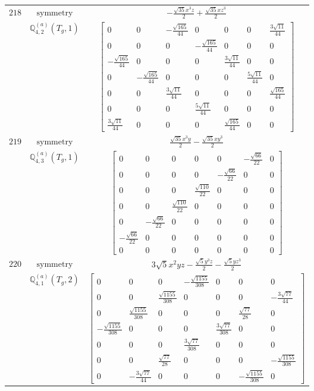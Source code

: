 \documentclass[fleqn,8pt,landscape]{jsarticle}
\begin{document}
\begin{longtable}{ccc}
$ 218 $ & $ \text{symmetry} $ & $ - \frac{\sqrt{35} x^{3} z}{2} + \frac{\sqrt{35} x z^{3}}{2} $ \\
$  $ & $ \mathbb{Q}_{4,2}^{(a)}(T_{g},1) $ & $ \begin{bmatrix} 0 & 0 & - \frac{\sqrt{165}}{44} & 0 & 0 & 0 & \frac{3 \sqrt{11}}{44} \\ 0 & 0 & 0 & - \frac{\sqrt{165}}{44} & 0 & 0 & 0 \\ - \frac{\sqrt{165}}{44} & 0 & 0 & 0 & \frac{3 \sqrt{11}}{44} & 0 & 0 \\ 0 & - \frac{\sqrt{165}}{44} & 0 & 0 & 0 & \frac{5 \sqrt{11}}{44} & 0 \\ 0 & 0 & \frac{3 \sqrt{11}}{44} & 0 & 0 & 0 & \frac{\sqrt{165}}{44} \\ 0 & 0 & 0 & \frac{5 \sqrt{11}}{44} & 0 & 0 & 0 \\ \frac{3 \sqrt{11}}{44} & 0 & 0 & 0 & \frac{\sqrt{165}}{44} & 0 & 0 \end{bmatrix} $ \\ \hline
$ 219 $ & $ \text{symmetry} $ & $ \frac{\sqrt{35} x^{3} y}{2} - \frac{\sqrt{35} x y^{3}}{2} $ \\
$  $ & $ \mathbb{Q}_{4,3}^{(a)}(T_{g},1) $ & $ \begin{bmatrix} 0 & 0 & 0 & 0 & 0 & - \frac{\sqrt{66}}{22} & 0 \\ 0 & 0 & 0 & 0 & - \frac{\sqrt{66}}{22} & 0 & 0 \\ 0 & 0 & 0 & \frac{\sqrt{110}}{22} & 0 & 0 & 0 \\ 0 & 0 & \frac{\sqrt{110}}{22} & 0 & 0 & 0 & 0 \\ 0 & - \frac{\sqrt{66}}{22} & 0 & 0 & 0 & 0 & 0 \\ - \frac{\sqrt{66}}{22} & 0 & 0 & 0 & 0 & 0 & 0 \\ 0 & 0 & 0 & 0 & 0 & 0 & 0 \end{bmatrix} $ \\ \hline
$ 220 $ & $ \text{symmetry} $ & $ 3 \sqrt{5} x^{2} y z - \frac{\sqrt{5} y^{3} z}{2} - \frac{\sqrt{5} y z^{3}}{2} $ \\
$  $ & $ \mathbb{Q}_{4,1}^{(a)}(T_{g},2) $ & $ \begin{bmatrix} 0 & 0 & 0 & - \frac{\sqrt{1155}}{308} & 0 & 0 & 0 \\ 0 & 0 & \frac{\sqrt{1155}}{308} & 0 & 0 & 0 & - \frac{3 \sqrt{77}}{44} \\ 0 & \frac{\sqrt{1155}}{308} & 0 & 0 & 0 & \frac{\sqrt{77}}{28} & 0 \\ - \frac{\sqrt{1155}}{308} & 0 & 0 & 0 & \frac{3 \sqrt{77}}{308} & 0 & 0 \\ 0 & 0 & 0 & \frac{3 \sqrt{77}}{308} & 0 & 0 & 0 \\ 0 & 0 & \frac{\sqrt{77}}{28} & 0 & 0 & 0 & - \frac{\sqrt{1155}}{308} \\ 0 & - \frac{3 \sqrt{77}}{44} & 0 & 0 & 0 & - \frac{\sqrt{1155}}{308} & 0 \end{bmatrix} $ \\ \hline

\end{longtable}
\end{document}

